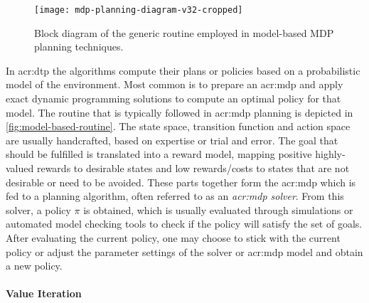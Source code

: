 \begin{figure}[!t]
	\centering
	\texttt{[image: mdp-planning-diagram-v32-cropped]}
	\caption{Block diagram of the generic routine employed in model-based MDP planning techniques.}
	\label{fig:model-based-routine}
\end{figure}

In \acrshort{acr:dtp} the algorithms compute their plans or policies based on a probabilistic model of the environment.
Most common is to prepare an \acrshort{acr:mdp} and apply exact dynamic programming solutions to compute an optimal policy for that model.
The routine that is typically followed in \acrshort{acr:mdp} planning is depicted in \autoref{fig:model-based-routine}.
The state space, transition function and action space are usually handcrafted, based on expertise or trial and error.
The goal that should be fulfilled is translated into a reward model, mapping positive highly-valued rewards to desirable states and low rewards/costs to states that are not desirable or need to be avoided.
These parts together form the \acrshort{acr:mdp} which is fed to a planning algorithm, often referred to as an \textit{\acrshort{acr:mdp} solver}.
From this solver, a policy $\pi$ is obtained, which is usually evaluated through simulations or automated model checking tools to check if the policy will satisfy the set of goals.%
After evaluating the current policy, one may choose to stick with the current policy or adjust the parameter settings of the solver or \acrshort{acr:mdp} model and obtain a new policy.


\paragraph{Value Iteration}
\label{sec:value-iteration}

